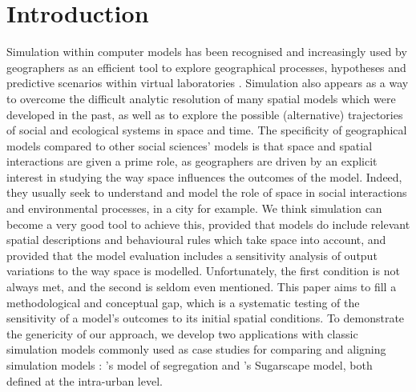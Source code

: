 \documentclass[Royal,sageh,times]{sagej}
\begin{document}

\maketitle



\section{Introduction}

Simulation within computer models has been recognised and increasingly used by geographers as an efficient tool to explore geographical processes, hypotheses and predictive scenarios within virtual laboratories \citep{batty1971modelling, batty2007model, carley1999generating, Quesneletal2009}. %
 Simulation also appears as a way to overcome the difficult analytic resolution of many spatial models which were developed in the past, as well as to explore the possible (alternative) trajectories of social and ecological systems in space and time. The specificity of geographical models compared to other social sciences' models is that space and spatial interactions are given a prime role, as geographers are driven by an explicit interest in studying the way space influences the outcomes of the model. Indeed, they usually seek to understand and model the role of space in social interactions and environmental processes, in a city for example. We think simulation can become a very good tool to achieve this, provided that models do include relevant spatial descriptions and behavioural rules which take space into account, and provided that the model evaluation includes a sensitivity analysis of output variations to the way space is modelled. Unfortunately, the first condition is not always met, and the second is seldom even mentioned. This paper aims to fill a methodological and conceptual gap, which is a systematic testing of the sensitivity of a model's outcomes to its initial spatial conditions. To demonstrate the genericity of our approach, we develop two applications with classic simulation models commonly used as case studies for comparing and aligning simulation models \citep{Axtelletal1996, wilensky2007making}: \citet{schelling1971dynamic}'s model of segregation and \citet{EpsteinAxtell1996}'s Sugarscape model, both defined at the intra-urban level.\\
\end{document}
